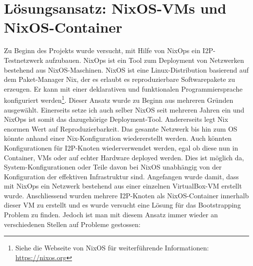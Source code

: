 \section{Lösungsansatz: NixOS-VMs und NixOS-Container}\label{sec:la1_nixos}

Zu Beginn des Projekts wurde versucht, mit Hilfe von NixOps ein I2P-Testnetzwerk aufzubauen.
NixOps ist ein Tool zum Deployment von Netzwerken bestehend aus NixOS-Maschinen.
NixOS ist eine Linux-Distribution basierend auf dem Paket-Manager Nix,
der es erlaubt es reproduzierbare Softwarepakete zu erzeugen.
Er kann mit einer deklarativen und funktionalen Programmiersprache konfiguriert werden\footnote{Siehe die Webseite von NixOS für weiterführende Informationen: \url{https://nixos.org}}.
Dieser Ansatz wurde zu Beginn aus mehreren Gründen ausgewählt.
Einerseits setze ich auch selber NixOS seit mehreren Jahren ein und NixOps ist somit das dazugehörige Deployment-Tool.
Andererseits legt Nix enormen Wert auf Reproduzierbarkeit.
Das gesamte Netzwerk bis hin zum OS könnte anhand einer Nix-Konfiguration wiedererstellt werden.
Auch könnten Konfigurationen für I2P-Knoten wiederverwendet werden, egal ob diese nun in Container,
VMs oder auf echter Hardware deployed werden.
Dies ist möglich da, System-Konfigurationen oder Teile davon bei NixOS unabhängig von der Konfiguration der effektiven Infrastruktur sind.
Angefangen wurde damit, dass mit NixOps ein Netzwerk bestehend aus einer einzelnen VirtualBox-VM erstellt wurde.
Anschliessend wurden mehrere I2P-Knoten als NixOS-Container innerhalb dieser VM zu erstellt und es wurde versucht eine Lösung für das Bootstrapping Problem zu finden.
Jedoch ist man mit diesem Ansatz immer wieder an verschiedenen Stellen auf Probleme gestossen:

